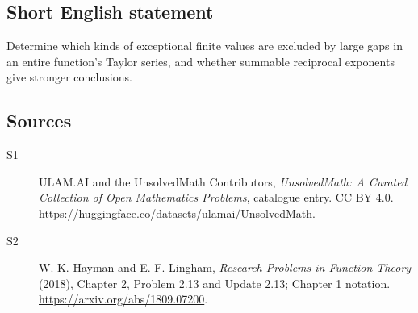 \documentclass[11pt]{article}
\begin{document}
\subsection{Short English statement}
Determine which kinds of exceptional finite values are excluded by large gaps in an entire function's Taylor series, and whether summable reciprocal exponents give stronger conclusions.
\subsection{Sources}
\begin{description}
\item[\hypertarget{source:statement:1}{S1}] ULAM.AI and the UnsolvedMath Contributors, \emph{UnsolvedMath: A Curated Collection of Open Mathematics Problems}, catalogue entry. CC BY 4.0. \url{https://huggingface.co/datasets/ulamai/UnsolvedMath}.
\item[\hypertarget{source:statement:2}{S2}] W. K. Hayman and E. F. Lingham, \emph{Research Problems in Function Theory} (2018), Chapter 2, Problem 2.13 and Update 2.13; Chapter 1 notation. \url{https://arxiv.org/abs/1809.07200}.
\end{description}
\label{end:statement}
\end{document}

